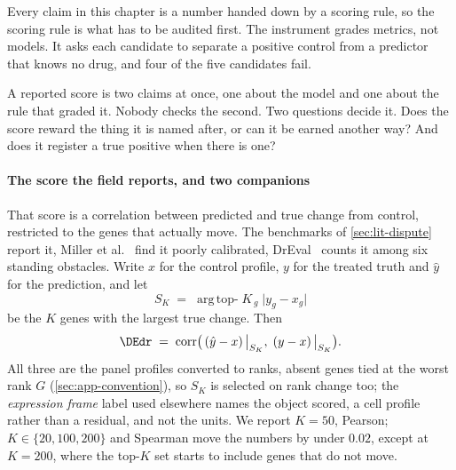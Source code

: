 
\label{sec:methods-metrics}   %


\begin{question}[1]
Every claim in this chapter is a number handed down by a scoring rule, so the
scoring rule is what has to be audited first. The instrument grades metrics, not
models. It asks each candidate to separate a positive control from a predictor
that knows no drug, and four of the five candidates fail.
\end{question}

\noindent
A reported score is two claims at once, one about the model and one about the
rule that graded it. Nobody checks the second. Two questions decide it. Does the
score reward the thing it is named after, or can it be earned another way? And
does it register a true positive when there is one?

\paragraph{The score the field reports, and two companions} That score is a correlation between
predicted and true change from control, restricted to the genes that actually
move. The benchmarks of \cref{sec:lit-dispute} report it,
Miller et al.~\cite{miller} find it poorly calibrated, DrEval~\cite{dreval}
counts it among six standing obstacles. Write $x$ for the control profile, $y$
for the treated truth and $\hat y$ for the
prediction, and let
\begin{equation}
 S_K \;=\; \operatorname*{arg\,top-}K_{\,g} \; \lvert y_g - x_g \rvert
\end{equation}
be the $K$ genes with the largest true change. Then
\begin{equation}
 \DEdr \;=\; \operatorname{corr}\!\big( \left(\hat{y} - x\right)\big|_{S_K}, \;
 \left(y - x\right)\big|_{S_K} \big).
\end{equation}
All three are the panel profiles converted to ranks, absent genes tied at the
worst rank $G$ (\cref{sec:app-convention}), so $S_K$ is selected on rank change
too; the \emph{expression frame} label used elsewhere names the object scored, a
cell profile rather than a residual, and not the units. We report $K = 50$,
Pearson; $K \in \{20, 100, 200\}$ and Spearman move the
numbers by under $0.02$, except at $K = 200$, where the top-$K$ set starts to
include genes that do not move.

